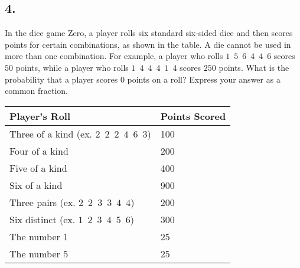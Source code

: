 \documentclass[12pt]{article}
\begin{document}
\begin{answer}
%
\end{answer}


\subsection*{4.}
In the dice game Zero, a player rolls six standard six-sided dice and then scores points for certain combinations, as shown in the table. A die cannot be used in more than one combination. For example, a player who rolls $1$~$5$~$6$~$4$~$4$~$6$ scores $50$ points, while a player who rolls $1$~$4$~$4$~$4$~$1$~$4$ scores $250$ points. What is the probability that a player scores $0$ points on a roll? Express your answer as a common fraction. 

\begin{center}
\begin{tabular}{L{6cm}R{3cm}} 
\toprule
  Player's Roll & Points Scored \\
\midrule
  Three of a kind (ex. $2$~$2$~$2$~$4$~$6$~$3$) & 100 \\
  Four of a kind                                & 200 \\
  Five of a kind                                & 400 \\
  Six of a kind                                 & 900 \\
  Three pairs (ex. $2$~$2$~$3$~$3$~$4$~$4$)     & 200 \\
  Six distinct (ex. $1$~$2$~$3$~$4$~$5$~$6$)    & 300 \\
  The number $1$                                &  25 \\
  The number $5$                                &  25 \\
\bottomrule
\end{tabular}
\end{center}
\end{document}
